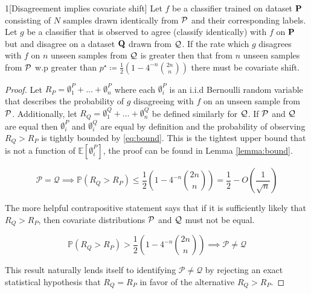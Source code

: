     \begin{manualtheorem}{1}[Disagreement implies covariate shift]
    Let $f$ be a classifier trained on dataset $\mathbf{P}$ consisting of $N$ samples drawn identically from $\mathcal{P}$ and their corresponding labels.
    Let $g$ be a classifier that is observed to agree (classify identically) with $f$ on $\mathbf{P}$ but and disagree on a dataset $\mathbf{Q}$ drawn from $\mathcal{Q}$.
    If the rate which $g$ disagrees with $f$ on $n$ unseen samples from $\mathcal{Q}$ is greater then that from $n$ unseen samples from $\mathcal{P}$ w.p greater than $p^\star \coloneqq \frac{1}{2}\left(1- 4^{-n} \binom{2n}{n}\right)$ there must be covariate shift.
\end{manualtheorem}
\begin{proof}
    Let $R_P=\emptyset^{P}_1+ \ldots+ \emptyset^P_n$ where each $\emptyset^P_i$ is an i.i.d Bernoulli random variable that describes the probability of $g$ disagreeing with $f$ on an unseen sample from $\mathcal{P}$.
    Additionally, let $R_Q=\emptyset^Q_1+ \ldots+ \emptyset^Q_n$ be defined similarly for $\mathcal{Q}$.
    If $\mathcal{P}$ and $\mathcal{Q}$ are equal then $\emptyset^P_i$ and $\emptyset^Q_i$ are equal by definition and the probability of observing $R_Q >R_P$ is tightly bounded by \autoref{eq:bound}.
    This is the tightest upper bound that is not a function of $\mathbb{E}[\emptyset^P_i]$, the proof can be found in Lemma \autoref{lemma:bound}.

    \begin{equation}
        \mathcal{P=Q} \implies \mathbb{P}\left(R_Q > R_P \right) \leq \frac{1}{2} \left(1-4^{-n} \binom{2 n}{n}\right) = \frac{1}{2} - O\left(\frac{1}{\sqrt{n}}\right)
        \label{eq:bound}
    \end{equation}


    The more helpful contrapositive statement says that if it is sufficiently likely that $R_Q>R_P$, then covariate distributions $\mathcal{P}$ and $\mathcal{Q}$ must not be equal.

    \begin{equation}
        \mathbb{P}\left(R_Q > R_P \right) > \frac{1}{2} \left(1-4^{-n} \binom{2 n}{n}\right) \implies \mathcal{P\neq Q}
        \label{eq:th1result}
    \end{equation}

    This result naturally lends itself to identifying $\mathcal{P\neq Q}$ by rejecting an exact statistical hypothesis that $R_Q=R_P$ in favor of the alternative $R_Q>R_P$.
\end{proof}

